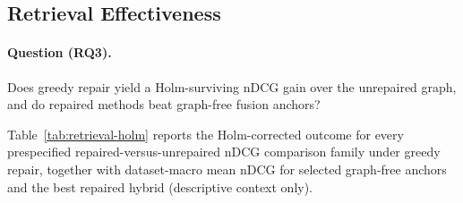 \documentclass[pdflatex,sn-basic,Numbered]{sn-jnl}
\begin{document}
\subsection{Retrieval Effectiveness}
\label{sec:results-retrieval}

\paragraph{Question (RQ3).}
Does greedy repair yield a Holm-surviving nDCG gain over the unrepaired
graph, and do repaired methods beat graph-free fusion anchors?

Table~\ref{tab:retrieval-holm} reports the Holm-corrected outcome for
every prespecified repaired-versus-unrepaired nDCG comparison family under
greedy repair, together with dataset-macro mean nDCG for selected
graph-free anchors and the best repaired hybrid (descriptive context only).
\end{document}
